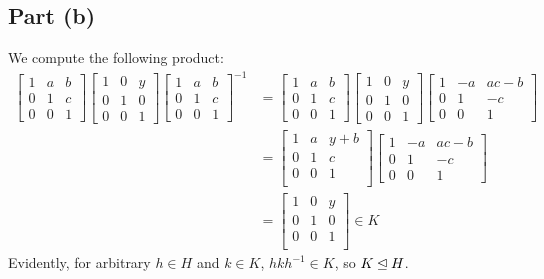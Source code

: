 \documentclass{article}
\begin{document}
\subsection*{Part (b)}
We compute the following product:
\begin{equation}
    \begin{split}
        \begin{bmatrix}
            1 & a & b \\
            0 & 1 & c \\
            0 & 0 & 1 
        \end{bmatrix}
        \begin{bmatrix}
            1 & 0 & y \\
            0 & 1 & 0 \\
            0 & 0 & 1 
        \end{bmatrix}
        \begin{bmatrix}
            1 & a & b \\
            0 & 1 & c \\
            0 & 0 & 1 
        \end{bmatrix}^{-1}
        & = \begin{bmatrix}
            1 & a & b \\
            0 & 1 & c \\
            0 & 0 & 1 
        \end{bmatrix}
        \begin{bmatrix}
            1 & 0 & y \\
            0 & 1 & 0 \\
            0 & 0 & 1 
        \end{bmatrix}
        \begin{bmatrix}
            1 & -a & ac - b \\
            0 & 1 & -c \\
            0 & 0 & 1 
        \end{bmatrix} \\
        & = 
        \begin{bmatrix}
            1 & a & y + b \\
            0 & 1 & c \\
            0 & 0 & 1 \\
        \end{bmatrix}
        \begin{bmatrix}
            1 & -a & ac - b \\
            0 & 1 & -c \\
            0 & 0 & 1 
        \end{bmatrix} \\
        & = 
        \begin{bmatrix}
            1 & 0 & y \\
            0 & 1 & 0 \\
            0 & 0 & 1 \\
        \end{bmatrix}  \in K
    \end{split}
\end{equation}
Evidently, for arbitrary $h \in H$ and $k \in K$, $hkh^{-1} \in K$, so $K \unlhd H$.
\end{document}
